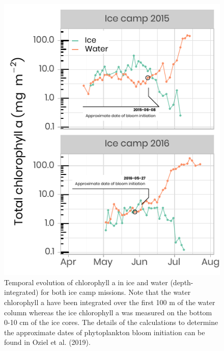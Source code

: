 \documentclass[12pt,a4paper]{scrartcl}
\begin{document}
\begin{figure}[h]
	\centering
	\includegraphics[scale = 2]{../../../graphs/fig10.pdf}
	\caption{Temporal evolution of chlorophyll a in ice and water (depth-integrated) for both ice camp missions. Note that the water chlorophyll a have been integrated over the first 100 m of the water column whereas the ice chlorophyll a was measured on the bottom 0-10 cm of the ice cores. The details of the calculations to determine the approximate dates of phytoplankton bloom initiation can be found in Oziel et al. (2019).}
\end{figure}

\clearpage
\newpage
\end{document}
